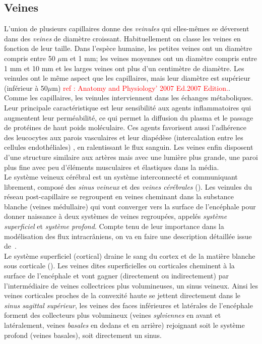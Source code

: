 \subsection{Veines}
L'union de plusieurs capillaires donne des {\em veinules} qui elles-mêmes se déversent dans des {\em veines} de diamètre croissant. Habituellement on classe les veines en fonction de leur taille. Dans l'espèce humaine, les petites veines ont un diamètre compris entre 50 $\mu$m et 1 mm; les veines moyennes ont un diamètre compris entre 1 mm et 10 mm et les larges veines ont plus d'un centimètre de diamètre. Les veinules ont le même aspect que les capillaires, mais leur diamètre est supérieur (inférieur à 50$\mu$m) \textcolor{red}{ref : Anatomy and Physiology’ 2007 Ed.2007 Edition.}.\\
Comme les capillaires, les veinules interviennent dans les échanges métaboliques. Leur principale caractéristique est leur sensibilité aux agents inflammatoires qui augmentent leur perméabilité, ce qui permet la diffusion du plasma et le passage de protéines de haut poids moléculaire. Ces agents favorisent aussi l'adhérence des leucocytes aux parois vasculaires et leur diapédèse (intercalation entre les cellules endothéliales) , en ralentissant le flux sanguin. Les veines enfin disposent d’une structure similaire aux artères mais avec une lumière plus grande, une paroi plus fine avec peu d’éléments musculaires et élastiques dans la média.\\
Le système veineux cérébral est un système interconnecté et communiquant librement, composé des {\em sinus veineux} et des {\em veines cérébrales} (\cite{Schaller2004}). Les veinules du réseau post-capillaire se regroupent en veines cheminant dans la substance blanche (veines médullaire) qui vont converger vers la surface de l'encéphale pour donner naissance à deux systèmes de veines regroupées, appelés {\em système superficiel} et {\em système profond}. Compte tenu de leur importance dans la modélisation des flux intracr\^aniens, on va en faire une description détaillée issue de~\cite{radioanatDrainage}.\\
Le système superficiel (cortical) draine le sang du cortex et de la matière blanche sous corticale (\cite{Aydin1997}). Les veines dites superficielles ou corticales cheminent à la surface de l’encéphale et vont gagner (directement ou indirectement) par l’intermédiaire de veines collectrices plus volumineuses, un sinus veineux. Ainsi les veines corticales proches de la convexité haute se jettent directement dans le {\em sinus sagittal supérieur}, les veines des faces inférieures et latérales de l’encéphale forment des collecteurs plus volumineux (veines {\em sylviennes} en avant et latéralement, veines {\em basales} en dedans et en arrière) rejoignant soit le système profond (veines basales), soit directement un sinus.\\
